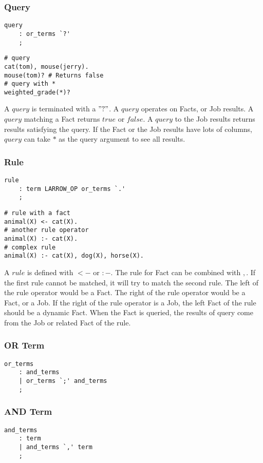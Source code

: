 \documentclass[prodmode,acmtecs]{acmsmall}
\begin{document}
\subsubsection{Query}
\begin{lstlisting}
query
	: or_terms `?'		
	;
\end{lstlisting}

\begin{lstlisting}
# query
cat(tom), mouse(jerry).
mouse(tom)? # Returns false
# query with *
weighted_grade(*)?
\end{lstlisting}

A $query$ is terminated with a $"?"$. A $query$ operates on Facts, or Job results. A $query$ 
 matching a Fact returns $true$ or $false$. A $query$ to the Job results returns results 
 satisfying the query. If the Fact or the Job results have lots of columns, $query$ can
 take $*$ as the query argument to see all results.
\medskip

\subsubsection{Rule}
\begin{lstlisting}
rule
	: term LARROW_OP or_terms `.'
	;
\end{lstlisting}

\begin{lstlisting}
# rule with a fact
animal(X) <- cat(X).
# another rule operator
animal(X) :- cat(X).
# complex rule
animal(X) :- cat(X), dog(X), horse(X).
\end{lstlisting}

A $rule$ is defined with $<-$ or $:-$. The rule for Fact can be combined with $,$.
 If the first rule cannot be matched, it will try to match the second rule.
 The left of the rule operator would be a Fact. The right of the rule operator would
 be a Fact, or a Job. If the right of the rule operator is a Job,
 the left Fact of the rule should be a dynamic Fact. When the Fact is queried,
 the results of query come from the Job or related Fact of the rule.
\medskip

\subsubsection{OR Term}
\begin{lstlisting}
or_terms
	: and_terms
	| or_terms `;' and_terms
	;
\end{lstlisting}

\subsubsection{AND Term}
\begin{lstlisting}
and_terms
	: term
	| and_terms `,' term	
	;
\end{lstlisting}
\end{document}
